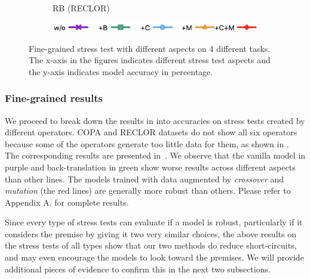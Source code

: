 \begin{figure}[!th]
\begin{subfigure}[b]{0.24\textwidth}
\caption{RB (RECLOR)}
\label{fig:arct_roberta}
\end{subfigure}
\newpage
\begin{subfigure}[b]{1.0\textwidth}
\centering
\includegraphics[width=0.4\columnwidth]{data/label.jpg}
\label{fig:label}
\end{subfigure}
\caption{Fine-grained stress test with different aspects on 4 different tasks. 
The x-axis in the figures indicates different stress test aspects and the y-axis indicates model accuracy in percentage.}
\label{fig:detail}
\end{figure}
%
\subsubsection{Fine-grained results}
\label{sec:fine-grained}
We proceed to break down the results in  into accuracies on stress tests
created by different operators. 
COPA and RECLOR datasets do not show all six operators
because some of the operators generate too little data
for them, as shown in . 
The corresponding results are presented in~. 
We observe that the vanilla model in purple and back-translation in green show
worse results across different aspects than other lines. 
The models trained with data augmented by \textit{crossover} and \textit{mutation} 
(the red lines) are generally more robust than others.
Please refer to Appendix A. 
for complete results. 

Since every type of stress tests 
can evaluate if a model is robust, particularly if it considers the 
premise by giving it two very similar choices, 
the above results on the stress tests of all types show that our two methods do 
reduce short-circuits, and may even encourage the models to look toward the
premises.
We will provide additional pieces of evidence to confirm this in the next two subsections.

